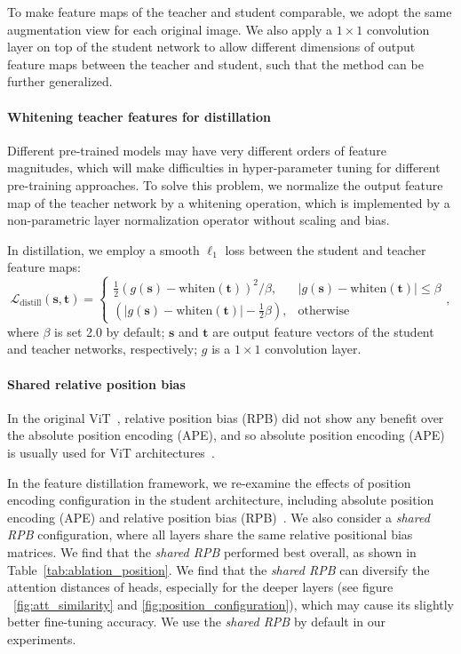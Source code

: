 \documentclass{article}
\begin{document}
To make feature maps of the teacher and student comparable, we adopt the same augmentation view for each original image. We also apply a $1\times 1$ convolution layer on top of the student network to allow different dimensions of output feature maps between the teacher and student, such that the method can be further generalized.

\paragraph{Whitening teacher features for distillation} Different pre-trained models may have very different orders of feature magnitudes, which will make difficulties in hyper-parameter tuning for different pre-training approaches. To solve this problem, we normalize the output feature map of the teacher network by a whitening operation, which is implemented by a non-parametric layer normalization operator without scaling and bias.

In distillation, we employ a smooth $\ell_1$ loss between the student and teacher feature maps:
\begin{equation}\label{eq:supervise}
    \mathcal{L}_\text{distill} (\mathbf{s}, \mathbf{t}) = \begin{cases}
\frac{1}{2} (g(\mathbf{s}) - \text{whiten}(\mathbf{t}))^2/\beta, & | g(\mathbf{s}) - \text{whiten}(\mathbf{t}) | \leq \beta \\
(|g(\mathbf{s})-\text{whiten}(\mathbf{t})|-\frac{1}{2}\beta), & \text{otherwise}
\end{cases},
\end{equation}
where $\beta$ is set 2.0 by default; $\mathbf{s}$ and $\mathbf{t}$ are output feature vectors of the student and teacher networks, respectively; $g$ is a $1\times 1$ convolution layer.

\paragraph{Shared relative position bias} In the original ViT~\cite{dosovitskiy2020vit}, relative position bias (RPB) did not show any benefit over the absolute position encoding (APE), and so absolute position encoding (APE) is usually used for ViT architectures~\cite{dosovitskiy2020vit,caron2021emerging,chen2021mocov3,MaskedAutoencoders2021}.

In the feature distillation framework, we re-examine the effects of position encoding configuration in the student architecture, including absolute position encoding (APE) and relative position bias (RPB)~\cite{liu2021swin}. We also consider a \emph{shared RPB} configuration, where all layers share the same relative positional bias matrices. We find that the \emph{shared RPB} performed best overall, as shown in Table~\ref{tab:ablation_position}. We find that the \emph{shared RPB} can diversify the attention distances of heads, especially for the deeper layers (see figure ~\ref{fig:att_similarity} and \ref{fig:position_configuration}), which may cause its slightly better fine-tuning accuracy. We use the \emph{shared RPB} by default in our experiments. 
\end{document}
